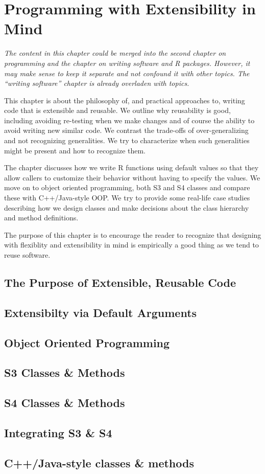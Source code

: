 \chapter{Programming with Extensibility in Mind}

\textsl{
The content in this chapter could be merged into 
the second chapter on programming and the
chapter on writing software and R packages.
However, it may make sense to keep it separate and not 
confound it with other topics. The ``writing software''
chapter is already overladen with topics.
}

\begin{summary}
  This chapter is about the philosophy of, and practical approaches
  to, writing code that is extensible and reusable.  We outline why
  reusability is good, including avoiding re-testing when we make
  changes and of course the ability to avoid writing new similar code.
  We contrast the trade-offs of over-generalizing and not recognizing 
  generalities.  We try to characterize when such generalities might
  be present and how to recognize them.
  

  The chapter discusses how we write R functions using default values
  so that they allow callers to customize their behavior without
  having to specify the values.  We move on to object oriented
  programming, both S3 and S4 classes and compare these with
  C++/Java-style OOP.  We try to provide some real-life case studies 
  describing how we design classes and make decisions about the class
  hierarchy and method definitions.

  The purpose of this chapter is to encourage the reader to recognize
  that designing with flexiblity and extensibility in mind is
  empirically a good thing as we tend to reuse software.
\end{summary}

\section{The Purpose of Extensible, Reusable Code}

\section{Extensibilty via Default Arguments}

\section{Object Oriented Programming}

\section{S3 Classes \& Methods}

\section{S4 Classes \& Methods}

\section{Integrating S3 \& S4}

\section{C++/Java-style classes \& methods}


